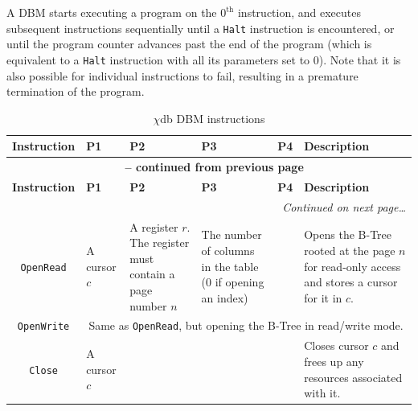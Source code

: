 \documentclass[10pt]{article}
\newcommand{\chidb}{$\chi$\textsf{db}}
\begin{document}
A DBM starts executing a program on the $0^{\textrm{th}}$ instruction, and executes  subsequent instructions sequentially until a \texttt{Halt} instruction is encountered, or until the program counter advances past the end of the program (which is equivalent to a \texttt{Halt} instruction with all its parameters set to 0). Note that it is also possible for individual instructions to fail, resulting in a premature termination of the program.


\begin{landscape}
\begin{longtable}{|c|p{3cm}|p{3cm}|p{3cm}|p{3cm}|p{4cm}|}
\caption{\chidb{} DBM instructions} \label{tab:dbmops} \\


\hline \textbf{Instruction} & \textbf{P1} & \textbf{P2}  & \textbf{P3}  & \textbf{P4}  & \textbf{Description}\\ \hline 
\endfirsthead

\multicolumn{6}{c}{{\bfseries \tablename\ \thetable{} -- continued from previous page}} \\
\hline \textbf{Instruction} & \textbf{P1} & \textbf{P2}  & \textbf{P3}  & \textbf{P4}  & \textbf{Description}\\ \hline 
\endhead

\multicolumn{6}{r}{\emph{Continued on next page\ldots}} \\
\endfoot

\hline \hline
\endlastfoot


%
%

\texttt{OpenRead} & 
A cursor $c$ & 
A register $r$. The register must contain a page number $n$ & 
The number of columns in the table (0 if opening an index) &
\cellcolor[gray]{0.9} &
Opens the B-Tree rooted at the page $n$ for read-only access and stores a cursor for it in $c$. \\\hline

\texttt{OpenWrite} & 
\multicolumn{5}{c|}{Same as \texttt{OpenRead}, but opening the B-Tree in read/write mode.} \\\hline

\texttt{Close} & 
A cursor $c$ & 
\cellcolor[gray]{0.9} & 
\cellcolor[gray]{0.9} &
\cellcolor[gray]{0.9} &
Closes cursor $c$ and frees up any resources associated with it. \\\hline


%
%


\end{longtable}
\end{landscape}
\end{document}

